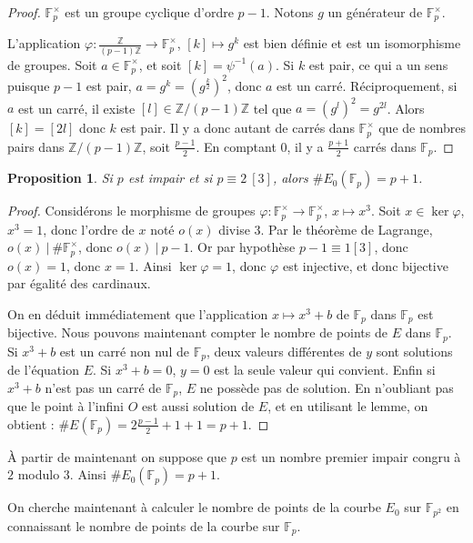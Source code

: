 \documentclass{article}
\theoremstyle{plain}%
\newtheorem{prop}[thm]{Proposition}
\theoremstyle{definition}%
\newcommand{\F}{\mathbb{F}}
\newcommand{\Z}{\mathbb{Z}}
\begin{document}
\begin{proof}
  $\F_{p}^\times$ est un groupe cyclique d'ordre $p-1$. 
  Notons $g$ un générateur de $\F_{p}^\times$. 
  
  L'application $ \varphi \colon \frac{\Z}{(p-1)\Z} \to \F_{p}^\times$,
  $[k] \mapsto g^k$
  est bien définie et est un isomorphisme de groupes.
  Soit $a\in \F_{p}^\times$, et soit $[k] = \psi^{-1}(a)$.
  Si $k$ est pair, ce qui a un sens puisque $p-1$ est pair, $a = g^k = (g^\frac{k}{2})^2$, donc $a$ est un carré.
  Réciproquement, si $a$ est un carré, il existe $[l]\in \Z/(p-1)\Z$ tel que $a = (g^l)^2 = g^{2l}$.
  Alors $[k] = [2l]$ donc $k$ est pair.
  Il y a donc autant de carrés dans $\F_{p}^\times$ que de nombres pairs dans $\Z/{(p-1)\Z}$, soit $\frac{p-1}{2}$. 
  En comptant $0$, il y a $\frac{p+1}{2}$ carrés dans $\F_{p}$. 
\end{proof}

\begin{prop}
  Si $p$ est impair et si $p \equiv 2\ [3]$, alors $\#E_0(\F_{p}) = p+1$.
\end{prop}

\begin{proof}
  Considérons le morphisme de groupes $\varphi \colon \F_{p}^\times \to \F_{p}^\times$, $x \mapsto x^3$. 
  Soit $x\in \ker \varphi$, $x^3 = 1$, donc l'ordre de $x$ noté $o(x)$ divise $3$. 
  Par le théorème de Lagrange, $o(x)\ |\ \#\F_{p}^\times$, donc $o(x)\ |\ p-1$. 
  Or par hypothèse $p-1\equiv 1[3]$, donc $o(x) = 1$, donc $x = 1$.
  Ainsi $\ker \varphi = {1}$, donc $\varphi$ est injective, et donc bijective par égalité des cardinaux.

  On en déduit immédiatement que l'application $x \mapsto x^3 + b$ de $\F_{p}$ dans $\F_{p}$ est bijective.
  Nous pouvons maintenant compter le nombre de points de $E$ dans $\F_{p}$. 
  Si $x^3 + b$ est un carré non nul de $\F_{p}$, deux valeurs différentes de $y$ sont solutions de l'équation $E$. 
  Si $x^3 + b = 0$, $y = 0$ est la seule valeur qui convient.
  Enfin si $x^3 + b$ n'est pas un carré de $\F_{p}$, $E$ ne possède pas de solution.
  En n'oubliant pas que le point à l'infini $O$ est aussi solution de $E$, et en utilisant le lemme, on obtient : $\#E(\F_{p}) = 2\frac{p-1}{2} + 1 + 1 = p+1$.
\end{proof}

À partir de maintenant on suppose que $p$ est un nombre premier impair congru à $2$ modulo $3$. 
Ainsi $\#E_0(\F_{p}) = p+1$. 


On cherche maintenant à calculer le nombre de points de la courbe $E_0$ sur $\F_{p^2}$ en connaissant le nombre de points de la courbe sur $\F_{p}$.
\end{document}
